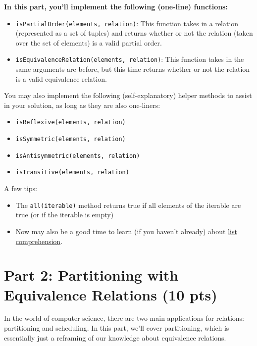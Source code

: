 \documentclass{article}
\begin{document}
    \vspace{3mm}
    \begin{tcolorbox}[colback=yellow!30]
        \textbf{In this part, you'll implement the following (one-line) functions:}
        \begin{itemize}
            \item \lstinline{isPartialOrder(elements, relation)}: This function takes in a relation (represented as a set of tuples) and returns whether or not the relation (taken over the set of elements) is a valid partial order.
            \item \lstinline{isEquivalenceRelation(elements, relation)}: This function takes in the same arguments are before, but this time returns whether or not the relation is a valid equivalence relation.
        \end{itemize}
        You may also implement the following (self-explanatory) helper methods to assist in your solution, as long as they are also one-liners:
        \begin{itemize}
            \item \lstinline{isReflexive(elements, relation)}
            \item \lstinline{isSymmetric(elements, relation)}
            \item \lstinline{isAntisymmetric(elements, relation)}
            \item \lstinline{isTransitive(elements, relation)}
        \end{itemize}
        \textbf{}

        \vspace{2mm}
        A few tips:
        \begin{itemize}
            \item The \lstinline{all(iterable)} method returns true if all elements of the iterable are true (or if the iterable is empty)
            \item Now may also be a good time to learn (if you haven't already) about \href{https://docs.python.org/3/tutorial/datastructures.html#list-comprehensions}{list comprehension}.
        \end{itemize}
    \end{tcolorbox}


\section*{Part 2: Partitioning with Equivalence Relations (10 pts)}
    In the world of computer science, there are two main applications for relations: partitioning and scheduling. In this part, we'll cover partitioning, which is essentially just a reframing of our knowledge about equivalence relations.
\end{document}
